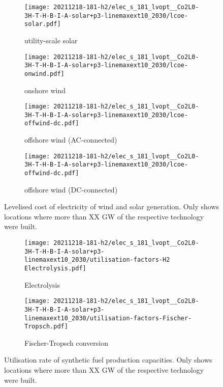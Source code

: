 \begin{figure}
    \begin{subfigure}{0.49\textwidth}
        \centering
        \caption{utility-scale solar}
        \texttt{[image: 20211218-181-h2/elec\_s\_181\_lvopt\_\_Co2L0-3H-T-H-B-I-A-solar+p3-linemaxext10\_2030/lcoe-solar.pdf]}
    \end{subfigure}
    \begin{subfigure}{0.49\textwidth}
        \centering
        \caption{onshore wind}
        \texttt{[image: 20211218-181-h2/elec\_s\_181\_lvopt\_\_Co2L0-3H-T-H-B-I-A-solar+p3-linemaxext10\_2030/lcoe-onwind.pdf]}
    \end{subfigure}
    \begin{subfigure}{0.49\textwidth}
        \centering
        \caption{offshore wind (AC-connected)}
        \texttt{[image: 20211218-181-h2/elec\_s\_181\_lvopt\_\_Co2L0-3H-T-H-B-I-A-solar+p3-linemaxext10\_2030/lcoe-offwind-dc.pdf]}
    \end{subfigure}
    \begin{subfigure}{0.49\textwidth}
        \centering
        \caption{offshore wind (DC-connected)}
        \texttt{[image: 20211218-181-h2/elec\_s\_181\_lvopt\_\_Co2L0-3H-T-H-B-I-A-solar+p3-linemaxext10\_2030/lcoe-offwind-dc.pdf]}
    \end{subfigure}
    \caption{Levelised cost of electricity of wind and solar generation. Only shows locations where more than XX GW of the respective technology were built.}
    \label{fig:si:lcoe}
\end{figure}

\begin{figure}
    \centering
    \begin{subfigure}{0.66\textwidth}
        \centering
        \caption{Electrolysis}
        \texttt{[image: 20211218-181-h2/elec\_s\_181\_lvopt\_\_Co2L0-3H-T-H-B-I-A-solar+p3-linemaxext10\_2030/utilisation-factors-H2 Electrolysis.pdf]}
    \end{subfigure}
    \begin{subfigure}{0.66\textwidth}
        \centering
        \caption{Fischer-Tropsch conversion}
        \texttt{[image: 20211218-181-h2/elec\_s\_181\_lvopt\_\_Co2L0-3H-T-H-B-I-A-solar+p3-linemaxext10\_2030/utilisation-factors-Fischer-Tropsch.pdf]}
    \end{subfigure}
    \caption{Utilisation rate of synthetic fuel production capacities. Only shows locations where more than XX GW of the respective technology were built.}
    \label{fig:si:utilisation-rate-map}
\end{figure}

